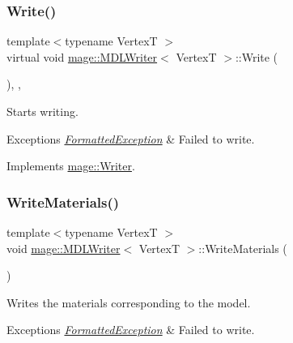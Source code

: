 \subsubsection{\texorpdfstring{Write()}{Write()}}
{\footnotesize\ttfamily template$<$typename VertexT $>$ \\
virtual void \hyperlink{classmage_1_1_m_d_l_writer}{mage\+::\+M\+D\+L\+Writer}$<$ VertexT $>$\+::Write (\begin{DoxyParamCaption}{ }\end{DoxyParamCaption})\hspace{0.3cm}{\ttfamily [override]}, {\ttfamily [private]}, {\ttfamily [virtual]}}

Starts writing.


\begin{DoxyExceptions}{Exceptions}
{\em \hyperlink{structmage_1_1_formatted_exception}{Formatted\+Exception}} & Failed to write. \\
\hline
\end{DoxyExceptions}


Implements \hyperlink{classmage_1_1_writer_a9baf695ef7f6180bef883f60bcb3ac07}{mage\+::\+Writer}.

\hypertarget{classmage_1_1_m_d_l_writer_af9416c1b2599ea86f4af8018dc0b9baf}{}\label{classmage_1_1_m_d_l_writer_af9416c1b2599ea86f4af8018dc0b9baf} 
\subsubsection{\texorpdfstring{Write\+Materials()}{WriteMaterials()}}
{\footnotesize\ttfamily template$<$typename VertexT $>$ \\
void \hyperlink{classmage_1_1_m_d_l_writer}{mage\+::\+M\+D\+L\+Writer}$<$ VertexT $>$\+::Write\+Materials (\begin{DoxyParamCaption}{ }\end{DoxyParamCaption})\hspace{0.3cm}{\ttfamily [private]}}

Writes the materials corresponding to the model.


\begin{DoxyExceptions}{Exceptions}
{\em \hyperlink{structmage_1_1_formatted_exception}{Formatted\+Exception}} & Failed to write. \\
\hline
\end{DoxyExceptions}
\hypertarget{classmage_1_1_m_d_l_writer_a3db84a4600cb777b37c666166a631689}{}\label{classmage_1_1_m_d_l_writer_a3db84a4600cb777b37c666166a631689} 
